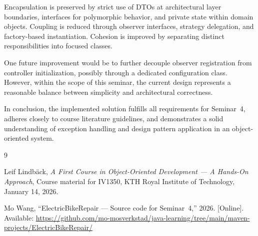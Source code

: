 \documentclass[a4paper]{scrartcl}
\begin{document}
Encapsulation is preserved by strict use of DTOs at architectural layer boundaries, interfaces for polymorphic behavior, and private state within domain objects. Coupling is reduced through observer interfaces, strategy delegation, and factory-based instantiation. Cohesion is improved by separating distinct responsibilities into focused classes.

One future improvement would be to further decouple observer registration from controller initialization, possibly through a dedicated configuration class. However, within the scope of this seminar, the current design represents a reasonable balance between simplicity and architectural correctness.

In conclusion, the implemented solution fulfills all requirements for Seminar~4, adheres closely to course literature guidelines, and demonstrates a solid understanding of exception handling and design pattern application in an object-oriented system.

\begin{thebibliography}{9}

Leif Lindbäck,
\textit{A First Course in Object-Oriented Development --- A Hands-On Approach},
Course material for IV1350,
KTH Royal Institute of Technology,
January 14, 2026.

Mo Wang,
``ElectricBikeRepair --- Source code for Seminar~4,''
2026.
[Online]. Available: \url{https://github.com/mo-mosverkstad/java-learning/tree/main/maven-projects/ElectricBikeRepair/}

\end{thebibliography}
\end{document}
